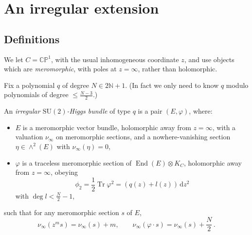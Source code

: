 \documentclass[12pt,letterpaper,reqno]{article}
\numberwithin{equation}{section}
\newcommand{\bbC}{\ensuremath{\mathbb C}}
\newcommand{\bbN}{\ensuremath{\mathbb N}}
\newcommand{\bbP}{\ensuremath{\mathbb P}}
\newcommand{\de}{\mathrm{d}}
\newcommand{\ti}[1]{\textit{#1}}
\DeclareMathOperator{\Tr}{Tr}
\DeclareMathOperator{\End}{End}
\newcommand{\SU}{\mathrm{SU}}
\begin{document}
\section{An irregular extension} \label{sec:irregular-extension}

\subsection{Definitions}

We let $C = \bbC\bbP^1$, with the usual inhomogeneous coordinate $z$, 
and use objects which are \ti{meromorphic},
with poles at $z = \infty$, rather than holomorphic.

Fix a polynomial $q$ of degree $N \in 2 \bbN + 1$.
(In fact we only need to know $q$ modulo polynomials of degree
$\le \frac{N-3}{2}$.)

\begin{defn}
An \ti{irregular $\SU(2)$-Higgs bundle} of type $q$ is
a pair $(E,\varphi)$, where:
\begin{itemize} 
  \item $E$ is a 
meromorphic vector bundle, holomorphic away from 
$z = \infty$, 
with a valuation $\nu_\infty$ on meromorphic sections,
and a nowhere-vanishing section $\eta \in \wedge^2(E)$ with $\nu_\infty(\eta) = 0$,
 \item $\varphi$ is a traceless meromorphic section of $\End(E) \otimes K_C$,
 holomorphic away from $z = \infty$, obeying 
\begin{equation} \label{eq:phi2-polynomial}
  \phi_2 = \frac12 \Tr \varphi^2 = (q(z) + l(z)) \, \de z^2
\end{equation}
with $\deg l < \frac{N}{2} - 1$,
\end{itemize}
such that for any meromorphic section $s$ of $E$, 
\begin{equation}
\nu_\infty(z^{m} s) = \nu_\infty(s) + m, \qquad \nu_\infty(\varphi \cdot s) = \nu_\infty(s) + \frac{N}{2} \, .  
\end{equation}
\end{defn}
\end{document}
